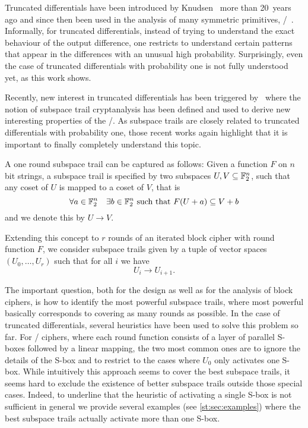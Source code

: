 Truncated differentials have been introduced by Knudsen~\cite{FSE:Knudsen94} more than 20~years ago and since then been used in the analysis of many symmetric primitives, \eg/~.
Informally, for truncated differentials, instead of trying to understand the exact behaviour of the output difference, one restricts to understand certain patterns that appear in the differences with an unusual high probability.
Surprisingly, even the case of truncated differentials with probability one is not fully understood yet, as this work shows.

Recently, new interest in truncated differentials has been triggered by~\cite{ToSC:GraRecRon16} where the notion of subspace trail cryptanalysis has been defined and used to derive new interesting properties of the \AES/.
As subspace trails are closely related to truncated differentials with probability one, those recent works again highlight that it is important to finally completely understand this topic.

A one round subspace trail can be captured as follows: Given a function $F$ on $n$ bit strings, a subspace trail is specified by two subspaces $U,V \subseteq \mathbb{F}_2^n$, such that any coset of $U$ is mapped to a coset of $V$, that is
\begin{equation*}
    \forall a\in \mathbb{F}_2^n \quad \exists b \in \mathbb{F}_2^n \ \text{such that}\ F(U+a) \subseteq V+b
\end{equation*}
and we denote this by $U \rightarrow V$.

Extending this concept to $r$ rounds of an iterated block cipher with round function $F$, we consider subspace trails given by a tuple of vector spaces $(U_0, \ldots, U_r)$ such that for all $i$ we have
\begin{equation*}
    U_i \rightarrow U_{i+1}.
\end{equation*}

The important question, both for the design as well as for the analysis of block ciphers, is how to identify the most powerful subspace trails, where most powerful basically corresponds to covering as many rounds as possible.
In the case of truncated differentials, several heuristics have been used to solve this problem so far.
For \SPN/ ciphers, where each round function consists of a layer of parallel S-boxes followed by a linear mapping, the two most common ones are to ignore the details of the S-box and to restrict to the cases where $U_0$ only activates one S-box.
While intuitively this approach seems to cover the best subspace trails, it seems hard to exclude the existence of better subspace trails outside those special cases.
Indeed, to underline that the heuristic of activating a single S-box is not sufficient in general we provide several examples (see \cref{st:sec:examples}) where the best subspace trails actually activate more than one S-box.

